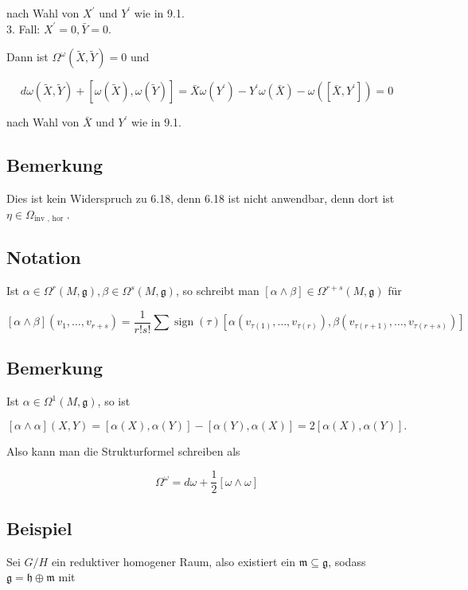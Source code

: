 \documentclass[10pt, letterpaper]{article}
\begin{document}
nach Wahl von $X^{\prime}$ und $Y^{\prime}$ wie in 9.1.\\
3. Fall: $X^{\prime}=0, \bar{Y}=0$.

Dann ist $\Omega^{\omega}(\tilde{X}, \tilde{Y})=0$ und

$$
d \omega(\tilde{X}, \tilde{Y})+[\omega(\tilde{X}), \omega(\tilde{Y})]=\bar{X} \omega\left(Y^{\prime}\right)-Y^{\prime} \omega(\bar{X})-\omega\left(\left[\bar{X}, Y^{\prime}\right]\right)=0
$$

nach Wahl von $\bar{X}$ und $Y^{\prime}$ wie in 9.1.

\subsection*{Bemerkung}
Dies ist kein Widerspruch zu 6.18, denn 6.18 ist nicht anwendbar, denn dort ist $\eta \in \Omega_{\text {inv }, \text { hor }}$.

\subsection*{Notation}
Ist $\alpha \in \Omega^{r}(M, \mathfrak{g}), \beta \in \Omega^{s}(M, \mathfrak{g})$, so schreibt man $[\alpha \wedge \beta] \in \Omega^{r+s}(M, \mathfrak{g})$ für

$$
[\alpha \wedge \beta]\left(v_{1}, \ldots, v_{r+s}\right)=\frac{1}{r!s!} \sum \operatorname{sign}(\tau)\left[\alpha\left(v_{\tau(1)}, \ldots, v_{\tau(r)}\right), \beta\left(v_{\tau(r+1)}, \ldots, v_{\tau(r+s)}\right)\right]
$$

\subsection*{Bemerkung}
Ist $\alpha \in \Omega^{1}(M, \mathfrak{g})$, so ist

$$
[\alpha \wedge \alpha](X, Y)=[\alpha(X), \alpha(Y)]-[\alpha(Y), \alpha(X)]=2[\alpha(X), \alpha(Y)] .
$$

Also kann man die Strukturformel schreiben als

$$
\Omega^{\omega}=d \omega+\frac{1}{2}[\omega \wedge \omega]
$$

\subsection*{Beispiel}
Sei $G / H$ ein reduktiver homogener Raum, also existiert ein $\mathfrak{m} \subseteq \mathfrak{g}$, sodass $\mathfrak{g}=\mathfrak{h} \oplus \mathfrak{m}$ mit
\end{document}
